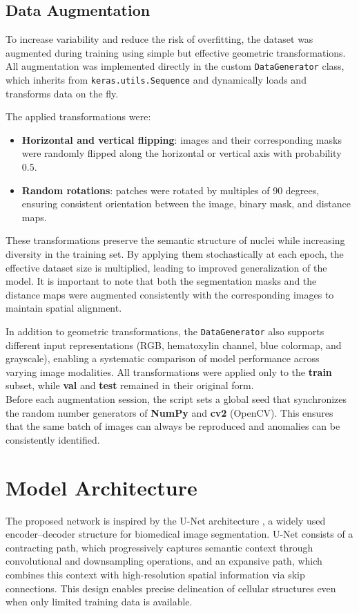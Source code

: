 \documentclass[target=bach,aauheader=,style=]{thud}
\begin{document}
\subsection{Data Augmentation}
To increase variability and reduce the risk of overfitting, the dataset was augmented during training using simple but effective geometric transformations. 
All augmentation was implemented directly in the custom \texttt{DataGenerator} class, which inherits from \texttt{keras.utils.Sequence} and dynamically loads and transforms data on the fly. 

The applied transformations were:
\begin{itemize}
    \item \textbf{Horizontal and vertical flipping}: images and their corresponding masks were randomly flipped along the horizontal or vertical axis with probability 0.5.
    \item \textbf{Random rotations}: patches were rotated by multiples of 90 degrees, ensuring consistent orientation between the image, binary mask, and distance maps.
\end{itemize}

These transformations preserve the semantic structure of nuclei while increasing diversity in the training set. 
By applying them stochastically at each epoch, the effective dataset size is multiplied, leading to improved generalization of the model. 
It is important to note that both the segmentation masks and the distance maps were augmented consistently with the corresponding images to maintain spatial alignment. 

In addition to geometric transformations, the \texttt{DataGenerator} also supports different input representations (RGB, hematoxylin channel, blue colormap, and grayscale), enabling a systematic comparison of model performance across varying image modalities. All transformations were applied only to the \textbf{train} subset, while \textbf{val} and \textbf{test} remained in their original form.\\

Before each augmentation session, the script sets a global seed that synchronizes the random number generators of \textbf{NumPy} and \textbf{cv2} (OpenCV). This ensures that the same batch of images can always be reproduced and anomalies can be consistently identified.
\section{Model Architecture}
\label{sec:model}
The proposed network is inspired by the U-Net architecture \cite{DBLP:journals/corr/RonnebergerFB15}, a widely used encoder–decoder structure for biomedical image segmentation. 
U-Net consists of a contracting path, which progressively captures semantic context through convolutional and downsampling operations, and an expansive path, which combines this context with high-resolution spatial information via skip connections. 
This design enables precise delineation of cellular structures even when only limited training data is available.
\end{document}
